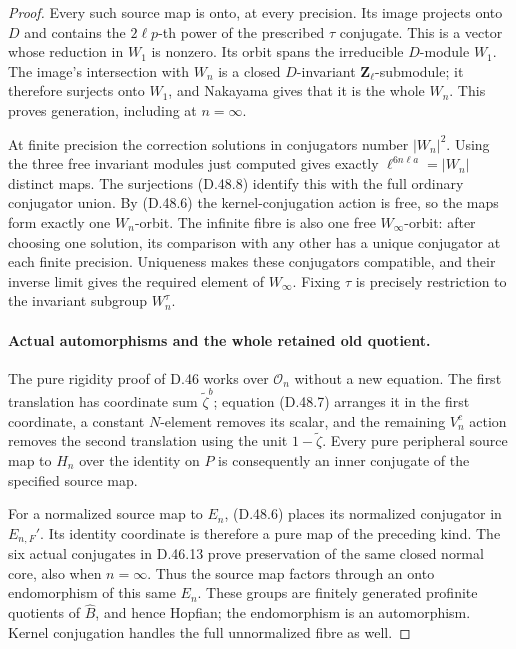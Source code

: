 \begin{proof}
Every such source map is onto, at every
precision. Its image projects onto \(D\)
and contains the \(2\ell p\)-th power of
the prescribed \(\tau\) conjugate.
This is a vector whose reduction in
\(W_1\) is nonzero. Its orbit spans
the irreducible \(D\)-module \(W_1\).
The image's intersection with \(W_n\)
is a closed \(D\)-invariant
\(\mathbf Z_\ell\)-submodule; it therefore
surjects onto \(W_1\), and Nakayama gives
that it is the whole \(W_n\).
This proves generation, including at
\(n=\infty\).

At finite precision the correction solutions
in conjugators number \(|W_n|^2\).
Using the three free invariant modules just
computed gives exactly
\(\ell^{6n\ell a}=|W_n|\) distinct maps.
The surjections \textup{(D.48.8)} identify
this with the full ordinary conjugator union.
By \textup{(D.48.6)} the kernel-conjugation
action is free, so the maps form exactly
one \(W_n\)-orbit.
The infinite fibre is also one free
\(W_\infty\)-orbit: after choosing one
solution, its comparison with any other
has a unique conjugator at each finite
precision. Uniqueness makes these conjugators
compatible, and their inverse limit gives
the required element of \(W_\infty\).
Fixing \(\tau\) is precisely restriction
to the invariant subgroup \(W_n^\tau\).

\paragraph{Actual automorphisms and the whole retained old quotient.}
The pure rigidity proof of D.46 works over
\(\mathcal O_n\) without a new equation.
The first translation has coordinate sum
\(\widetilde\zeta^b\); equation
\textup{(D.48.7)} arranges it in the first
coordinate, a constant \(N\)-element
removes its scalar, and the remaining
\(V_n^c\) action removes the second
translation using the unit
\(1-\widetilde\zeta\).
Every pure peripheral source map to
\(H_n\) over the identity on \(P\)
is consequently an inner conjugate of
the specified source map.

For a normalized source map to \(E_n\),
\textup{(D.48.6)} places its normalized
conjugator in \(E_{n,F}'\). Its identity
coordinate is therefore a pure map of
the preceding kind. The six actual
conjugates in D.46.13 prove preservation
of the same closed normal core, also
when \(n=\infty\). Thus the source map
factors through an onto endomorphism of
this same \(E_n\). These groups are
finitely generated profinite quotients
of \(\widehat B\), and hence Hopfian;
the endomorphism is an automorphism.
Kernel conjugation handles the full
unnormalized fibre as well.


\end{proof}
